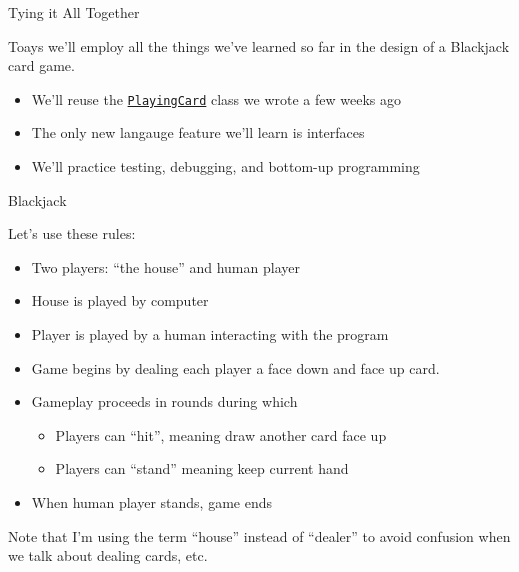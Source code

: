 \documentclass{beamer}
\author[Chris Simpkins] 
{Christopher Simpkins \\\texttt{chris.simpkins@gatech.edu}}
\institute[Georgia Tech] %
\date[CS 1331]{}
\newcommand{\code}{http://www.cc.gatech.edu/~simpkins/teaching/gatech/cs1331/code}
\begin{document}
\begin{frame}
  \titlepage
\end{frame}



\begin{frame}[fragile]{Tying it All Together}



Toays we'll employ all the things we've learned so far in the design of a Blackjack card game.
\begin{itemize}
\item We'll reuse the \href{\code/PlayingCard.java}{{\tt PlayingCard}} class we wrote a few weeks ago
\item The only new langauge feature we'll learn is interfaces
\item We'll practice testing, debugging, and bottom-up programming
\end{itemize}


\end{frame}

\begin{frame}[fragile]{Blackjack}


Let's use these rules:
\begin{itemize}
\item Two players: ``the house'' and human player
\item House is played by computer
\item Player is played by a human interacting with the program
\item Game begins by dealing each player a face down and face up card.
\item Gameplay proceeds in rounds during which
\begin{itemize}
\item Players can ``hit'', meaning draw another card face up
\item Players can ``stand'' meaning keep current hand
\end{itemize}
\item When human player stands, game ends
\end{itemize}
Note that I'm using the term ``house'' instead of ``dealer'' to avoid confusion when we talk about dealing cards, etc.
\end{frame}
\end{document}
